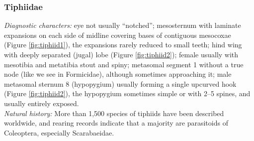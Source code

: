 \documentclass[letterpaper, 11pt]{article}
\begin{document}
\subsubsection{Tiphiidae}
\noindent{}\textit{Diagnostic characters:} eye not usually ``notched''; mesosternum with laminate expansions on each side of midline covering bases of contiguous mesocoxae (Figure \ref{fig:tiphiid1}), the expansions rarely reduced to small teeth; hind wing with deeply separated (jugal) lobe (Figure \ref{fig:tiphiid2}); female usually with mesotibia and metatibia stout and spiny; metasomal segment 1 without a true node (like we see in Formicidae), although sometimes approaching it; male metasomal sternum 8 (hypopygium) usually forming a single upcurved hook (Figure \ref{fig:tiphiid2}), the hypopygium sometimes simple or with 2--5 spines, and usually entirely exposed.\\

\noindent{}\textit{Natural history:} More than 1,500 species of tiphiids have been described worldwide, and rearing records indicate that a majority are parasitoids of Coleoptera, especially Scarabaeidae. \\
\end{document}
